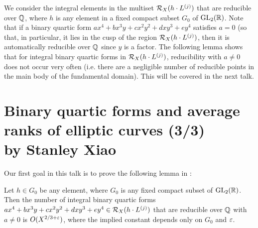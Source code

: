 \documentclass[12pt,amsfont]{amsart}
\begin{document}
We consider the integral elements in the multiset $\mathcal{R}_X(h \cdot L^{(j)})$ that are reducible over ${\mathbb Q}$, where $h$ is any element in a fixed compact subset $G_0$ of $\operatorname{GL}_2({\mathbb R})$. Note that if a binary quartic form $ax^4 + bx^3 y + cx^2 y^2 + dxy^3 + ey^4$ satisfies $a = 0$ (so that, in particular, it lies in the cusp of the region $\mathcal{R}_X(h \cdot L^{(j)})$, then it is automatically reducible over ${\mathbb Q}$ since $y$ is a factor. The following lemma shows that for integral binary quartic forms in $\mathcal{R}_X(h \cdot L^{(j)})$, reducibility with $a \ne 0$ does not occur very often (i.e. there are a negligible number of reducible points in the main body of the fundamental domain). This will be covered in the next talk. 

\newpage
\section{Binary quartic forms and average ranks of elliptic curves (3/3) \\ by Stanley Xiao}

Our first goal in this talk is to prove the following lemma in \cite{BS1}:

\begin{lem} Let $h \in G_0$ be any element, where $G_0$ is any fixed compact subset of $\operatorname{GL}_2({\mathbb R})$. Then the number of integral binary quartic forms $ax^4 + bx^3 y+ c x^2 y^2 + dxy^3 + ey^4 \in \mathcal{R}_X(h \cdot L^{(j)})$ that are reducible over ${\mathbb Q}$ with $a \ne 0$ is $O(X^{2/3 + \varepsilon})$, where the implied constant depends only on $G_0$ and $\varepsilon$.
\end{lem}
\end{document}
